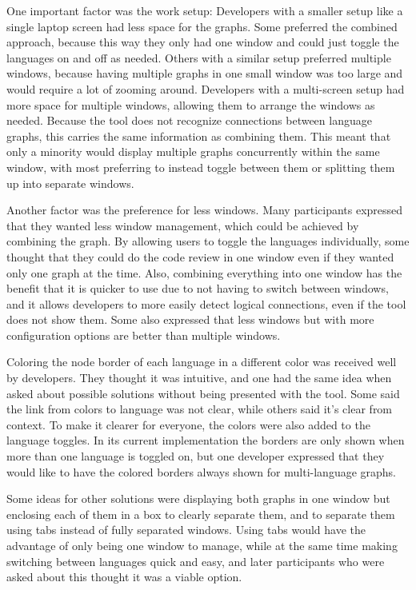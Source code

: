 \documentclass[a4paper,11pt,twoside]{article}
\theoremstyle{definition} %
\begin{document}
One important factor was the work setup: Developers with a smaller setup like a single laptop screen had less space for the graphs. Some preferred the combined approach, because this way they only had one window and could just toggle the languages on and off as needed. Others with a similar setup preferred multiple windows, because having multiple graphs in one small window was too large and would require a lot of zooming around. Developers with a multi-screen setup had more space for multiple windows, allowing them to arrange the windows as needed. Because the tool does not recognize connections between language graphs, this carries the same information as combining them. This meant that only a minority would display multiple graphs concurrently within the same window, with most preferring to instead toggle between them or splitting them up into separate windows. 

Another factor was the preference for less windows. Many participants expressed that they wanted less window management, which could be achieved by combining the graph. By allowing users to toggle the languages individually, some thought that they could do the code review in one window even if they wanted only one graph at the time. Also, combining everything into one window has the benefit that it is quicker to use due to not having to switch between windows, and it allows developers to more easily detect logical connections, even if the tool does not show them. Some also expressed that less windows but with more configuration options are better than multiple windows. 

Coloring the node border of each language in a different color was received well by developers. They thought it was intuitive, and one had the same idea when asked about possible solutions without being presented with the tool. Some said the link from colors to language was not clear, while others said it’s clear from context. To make it clearer for everyone, the colors were also added to the language toggles. In its current implementation the borders are only shown when more than one language is toggled on, but one developer expressed that they would like to have the colored borders always shown for multi-language graphs. 

Some ideas for other solutions were displaying both graphs in one window but enclosing each of them in a box to clearly separate them, and to separate them using tabs instead of fully separated windows. Using tabs would have the advantage of only being one window to manage, while at the same time making switching between languages quick and easy, and later participants who were asked about this thought it was a viable option.
\end{document}
